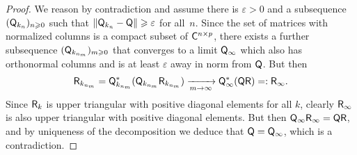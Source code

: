 \begin{proof}
    We reason by contradiction and assume
    there is $\varepsilon > 0$ and a subsequence $(\mathsf Q_{k_n})_{n\geqslant 0}$ such that $\lVert\mathsf Q_{k_n} - \mathsf Q\rVert \geqslant \varepsilon$ for all~$n$.
    Since the set of matrices with normalized columns is a compact subset of $\mathsf C^{n \times p}$,
    there exists a further subsequence $(\mathsf Q_{k_{n_m}})_{m\geqslant 0}$ that converges to a limit $\mathsf Q_{\infty}$
    which also has orthonormal columns and is at least $\varepsilon$ away in norm from $\mathsf Q$.
    But then
    \[
        \mathsf R_{k_{n_m}}
        = \mathsf Q_{k_{n_m}}^* ( \mathsf Q_{k_{n_m}} \mathsf R_{k_{n_m}})
        \xrightarrow[m \to \infty]{} \mathsf Q_{\infty}^* (\mathsf Q \mathsf R) =: \mathsf R_{\infty}.
    \]
    Since $\mathsf R_k$ is upper triangular with positive diagonal elements for all $k$,
    clearly $\mathsf R_{\infty}$ is also upper triangular with positive diagonal elements.
    But then $\mathsf Q_{\infty} \mathsf R_{\infty} = \mathsf Q \mathsf R$,
    and by uniqueness of the decomposition we deduce that $\mathsf Q = \mathsf Q_{\infty}$,
    which is a contradiction.
\end{proof}

